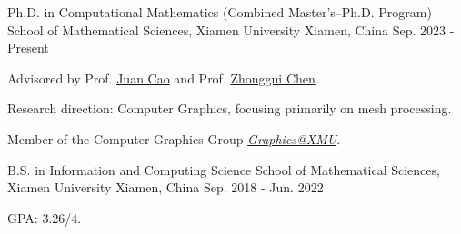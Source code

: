 

\begin{cventries}

  \cventry
    {Ph.D. in Computational Mathematics (Combined Master’s–Ph.D. Program)} %
    {School of Mathematical Sciences, Xiamen University} %
    {Xiamen, China} %
    {Sep. 2023 - Present}
    {
      \begin{cvitems}
        \item {Advisored by Prof. \href{https://graphics.xmu.edu.cn/~juancao/}{Juan Cao} and Prof. \href{https://graphics.xmu.edu.cn/~zgchen/}{Zhonggui Chen}.}
        \item {Research direction: Computer Graphics, focusing primarily on mesh processing.}
        \item {Member of the Computer Graphics Group \emph{\href{https://graphics.xmu.edu.cn/}{Graphics@XMU}}.}
      \end{cvitems}
    }

  \cventry
    {B.S. in Information and Computing Science} %
    {School of Mathematical Sciences, Xiamen University} %
    {Xiamen, China} %
    {Sep. 2018 - Jun. 2022}
    {
      \begin{cvitems} %
        \item {GPA: 3.26/4.}
      \end{cvitems}
    }
\end{cventries}

